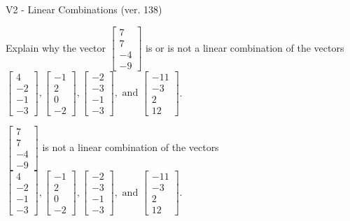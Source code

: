 \begin{exercise}
  \begin{exerciseTitle}V2 - Linear Combinations (ver. 138)\end{exerciseTitle}
  \begin{exerciseStatement}
    Explain why the vector \(\left[\begin{array}{c}
7 \\
7 \\
-4 \\
-9
\end{array}\right]\)  is or is not a linear 
	combination of the vectors \(\left[\begin{array}{c}
4 \\
-2 \\
-1 \\
-3
\end{array}\right] , \left[\begin{array}{c}
-1 \\
2 \\
0 \\
-2
\end{array}\right] , \left[\begin{array}{c}
-2 \\
-3 \\
-1 \\
-3
\end{array}\right] , \text{ and } \left[\begin{array}{c}
-11 \\
-3 \\
2 \\
12
\end{array}\right]\).
	


  \end{exerciseStatement}
  \begin{exerciseAnswer}
   \(\left[\begin{array}{c}
7 \\
7 \\
-4 \\
-9
\end{array}\right]\) 
  	 is not  
	a linear combination of the vectors \(\left[\begin{array}{c}
4 \\
-2 \\
-1 \\
-3
\end{array}\right] , \left[\begin{array}{c}
-1 \\
2 \\
0 \\
-2
\end{array}\right] , \left[\begin{array}{c}
-2 \\
-3 \\
-1 \\
-3
\end{array}\right] , \text{ and } \left[\begin{array}{c}
-11 \\
-3 \\
2 \\
12
\end{array}\right]\).


\end{exerciseAnswer}
\end{exercise}
